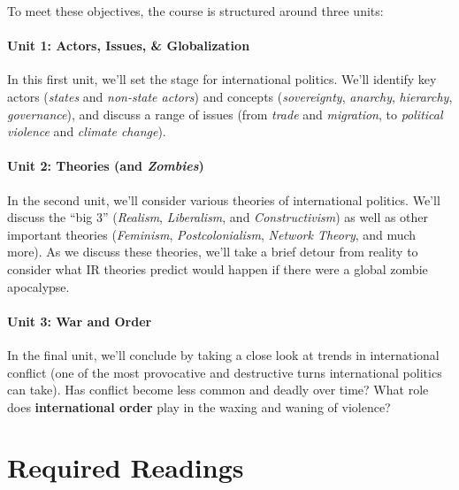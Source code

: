 \documentclass[11pt,]{article}
\begin{document}
To meet these objectives, the course is structured around three units:

\hypertarget{unit-1-actors-issues-globalization-1}{%
\paragraph{Unit 1: Actors, Issues, \&
Globalization}\label{unit-1-actors-issues-globalization-1}}

In this first unit, we'll set the stage for international politics.
We'll identify key actors (\emph{states} and \emph{non-state actors})
and concepts (\emph{sovereignty}, \emph{anarchy}, \emph{hierarchy},
\emph{governance}), and discuss a range of issues (from \emph{trade} and
\emph{migration}, to \emph{political violence} and \emph{climate
change}).

\hypertarget{unit-2-theories-and-zombies-1}{%
\paragraph{\texorpdfstring{Unit 2: Theories (and
\emph{Zombies})}{Unit 2: Theories (and Zombies)}}\label{unit-2-theories-and-zombies-1}}

In the second unit, we'll consider various theories of international
politics. We'll discuss the ``big 3'' (\emph{Realism},
\emph{Liberalism}, and \emph{Constructivism}) as well as other important
theories (\emph{Feminism}, \emph{Postcolonialism}, \emph{Network
Theory}, and much more). As we discuss these theories, we'll take a
brief detour from reality to consider what IR theories predict would
happen if there were a global zombie apocalypse.

\hypertarget{unit-3-war-and-order-1}{%
\paragraph{Unit 3: War and Order}\label{unit-3-war-and-order-1}}

In the final unit, we'll conclude by taking a close look at trends in
international conflict (one of the most provocative and destructive
turns international politics can take). Has conflict become less common
and deadly over time? What role does \textbf{international order} play
in the waxing and waning of violence?

\hypertarget{required-readings}{%
\section{Required Readings}\label{required-readings}}
\end{document}
